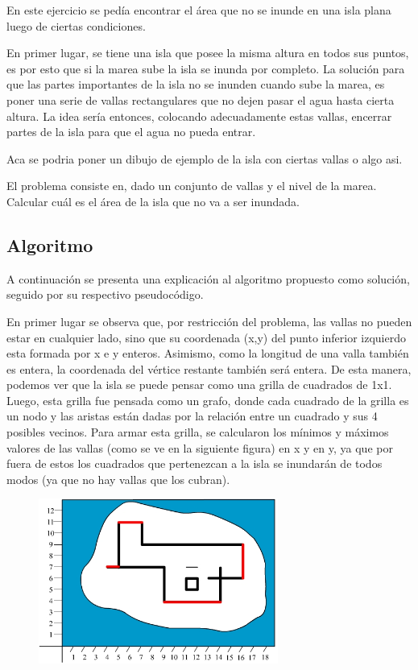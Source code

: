 \documentclass[a4paper, 12pt]{article}
\begin{document}
En este ejercicio se pedía encontrar el área que no se inunde en una isla plana luego de ciertas condiciones.

En primer lugar, se tiene una isla que posee la misma altura en todos sus puntos, es por esto que si la marea sube la isla se inunda por completo. La solución para que las partes importantes de la isla no se inunden cuando sube la marea, es poner una serie de vallas rectangulares que no dejen pasar el agua hasta cierta altura. La idea sería entonces, colocando adecuadamente estas vallas, encerrar partes de la isla para que el agua no pueda entrar.

Aca se podria poner un dibujo de ejemplo de la isla con ciertas vallas o algo asi.

El problema consiste en, dado un conjunto de vallas y el nivel de la marea. Calcular cuál es el área de la isla que no va a ser inundada.

\subsection*{Algoritmo}

A continuación se presenta una explicación al algoritmo propuesto como solución, seguido por su respectivo pseudocódigo.

En primer lugar se observa que, por restricción del problema, las vallas no pueden estar en cualquier lado, sino que su coordenada (x,y) del punto inferior izquierdo esta formada por x e y enteros. Asimismo, como la longitud de una valla también es entera, la coordenada del vértice restante también será entera. De esta manera, podemos ver que la isla se puede pensar como una grilla de cuadrados de 1x1. Luego, esta grilla fue pensada como un grafo, donde cada cuadrado de la grilla es un nodo y las aristas están dadas por la relación entre un cuadrado y sus 4 posibles vecinos. Para armar esta grilla, se calcularon los mínimos y máximos valores de las vallas (como se ve en la siguiente figura) en x y en y, ya que por fuera de estos los cuadrados que pertenezcan a la isla se inundarán de todos modos (ya que no hay vallas que los cubran).


\begin{figure}[H]
\centering
\includegraphics[width=0.7\textwidth]{imagenes/im2_ej2.jpg} 
\end{figure}
\end{document}
